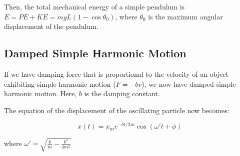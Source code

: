 \documentclass{article}
\begin{document}
Then, the total mechanical energy of a simple pendulum is $E = PE + KE = mgL(1-\cos{\theta_0})$, where $\theta_0$ is the maximum angular displacement of the pendulum.

\subsection{Damped Simple Harmonic Motion}

If we have damping force that is proportional to the velocity of an object exhibiting simple harmonic motion ($F = -bv$), we now have damped simple harmonic motion. Here, $b$ is the damping constant.

The equation of the displacement of the oscillating particle now becomes:

\[ x(t) = x_m e^{-bt/2m} \cos{(\omega't + \phi)} \]

where $\omega' = \sqrt{\frac{k}{m} - \frac{b^2}{4m^2}}$
\end{document}

